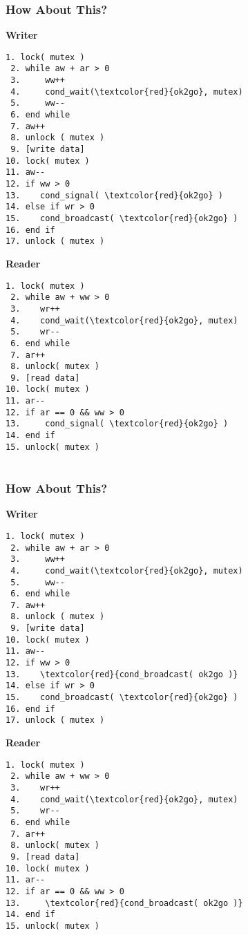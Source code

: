 \begin{frame}[fragile]
	\frametitle{How About This?}

	\begin{multicols}{2}
		\small
		\textbf{Writer}
		\begin{Verbatim}[commandchars=\\\{\}]
 1. lock( mutex )
 2. while aw + ar > 0
 3.     ww++
 4.     cond_wait(\textcolor{red}{ok2go}, mutex)
 5.     ww--
 6. end while
 7. aw++
 8. unlock ( mutex )
 9. [write data]
10. lock( mutex )
11. aw--
12. if ww > 0
13.    cond_signal( \textcolor{red}{ok2go} )
14. else if wr > 0
15.    cond_broadcast( \textcolor{red}{ok2go} )
16. end if
17. unlock ( mutex )
		\end{Verbatim}
		\columnbreak
		\textbf{Reader}
		\begin{Verbatim}[commandchars=\\\{\}]
 1. lock( mutex )
 2. while aw + ww > 0
 3.    wr++
 4.    cond_wait(\textcolor{red}{ok2go}, mutex)
 5.    wr--
 6. end while
 7. ar++
 8. unlock( mutex )
 9. [read data]
10. lock( mutex )
11. ar--
12. if ar == 0 && ww > 0
13.     cond_signal( \textcolor{red}{ok2go} )
14. end if
15. unlock( mutex )


		\end{Verbatim}
	\end{multicols}
	\vspace{-2em}
\end{frame}


\begin{frame}[fragile]
	\frametitle{How About This?}

	\begin{multicols}{2}
		\small
		\textbf{Writer}
		\begin{Verbatim}[commandchars=\\\{\}]
 1. lock( mutex )
 2. while aw + ar > 0
 3.     ww++
 4.     cond_wait(\textcolor{red}{ok2go}, mutex)
 5.     ww--
 6. end while
 7. aw++
 8. unlock ( mutex )
 9. [write data]
10. lock( mutex )
11. aw--
12. if ww > 0
13.    \textcolor{red}{cond_broadcast( ok2go )}
14. else if wr > 0
15.    cond_broadcast( \textcolor{red}{ok2go} )
16. end if
17. unlock ( mutex )
		\end{Verbatim}
		\columnbreak
		\textbf{Reader}
		\begin{Verbatim}[commandchars=\\\{\}]
 1. lock( mutex )
 2. while aw + ww > 0
 3.    wr++
 4.    cond_wait(\textcolor{red}{ok2go}, mutex)
 5.    wr--
 6. end while
 7. ar++
 8. unlock( mutex )
 9. [read data]
10. lock( mutex )
11. ar--
12. if ar == 0 && ww > 0
13.     \textcolor{red}{cond_broadcast( ok2go )}
14. end if
15. unlock( mutex )


		\end{Verbatim}
	\end{multicols}
	\vspace{-2em}
\end{frame}


